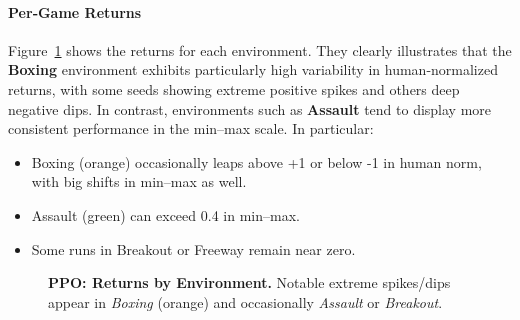 \paragraph{Per‐Game Returns}
Figure~\ref{fig:ppo_returns_pergame} shows the returns for each environment. They clearly illustrates that the \textbf{Boxing} environment exhibits particularly high variability in human-normalized returns, with some seeds showing extreme positive spikes and others deep negative dips. In contrast, environments such as \textbf{Assault} tend to display more consistent performance in the min--max scale. In particular:
\begin{itemize}
	\item Boxing (orange) occasionally leaps above +1 or below -1 in human norm,
	with big shifts in min--max as well.
	\item Assault (green) can exceed 0.4 in min--max.
	\item Some runs in Breakout or Freeway remain near zero.
\end{itemize}

\begin{figure} 
	\centering
	\quad
	\caption{\textbf{PPO: Returns by Environment.} 
		Notable extreme spikes/dips appear in \emph{Boxing} (orange) 
		and occasionally \emph{Assault} or \emph{Breakout}.}
	\label{fig:ppo_returns_pergame}
\end{figure}

